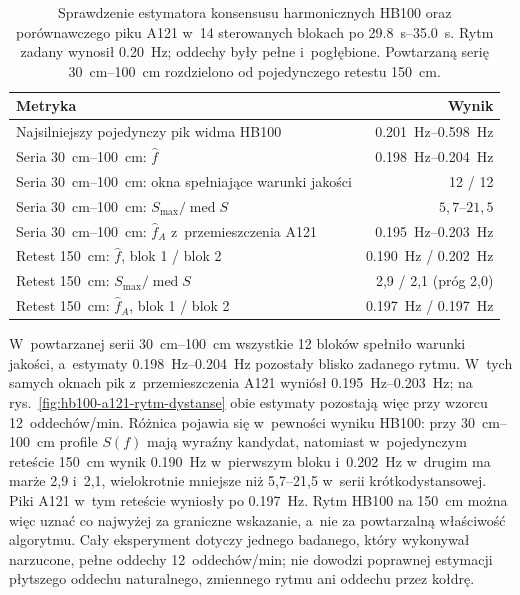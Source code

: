 \documentclass[12pt,a4paper,oneside]{report}
\begin{document}
\begin{table}[H]
\centering
\caption{Sprawdzenie estymatora konsensusu harmonicznych HB100 oraz
porównawczego piku A121 w~14 sterowanych blokach po
\SIrange{29.8}{35.0}{s}. Rytm zadany wynosił \SI{0.20}{Hz}; oddechy były
pełne i~pogłębione. Powtarzaną serię \SIrange{30}{100}{cm} rozdzielono od
pojedynczego retestu \SI{150}{cm}.}
\label{tab:hb100-harmonic-rhythm}
\small
\begin{tabular}{@{}p{8.3cm}r@{}}
\toprule
Metryka & Wynik \\
\midrule
Najsilniejszy pojedynczy pik widma HB100 & \SIrange{0.201}{0.598}{Hz} \\
Seria \SIrange{30}{100}{cm}: $\hat f$ & \SIrange{0.198}{0.204}{Hz} \\
Seria \SIrange{30}{100}{cm}: okna spełniające warunki jakości & 12 / 12 \\
Seria \SIrange{30}{100}{cm}: $S_{\max}/\operatorname{med}S$ & $5{,}7$--$21{,}5$ \\
Seria \SIrange{30}{100}{cm}: $\hat f_A$ z~przemieszczenia A121 & \SIrange{0.195}{0.203}{Hz} \\
Retest \SI{150}{cm}: $\hat f$, blok 1 / blok 2 & \SI{0.190}{Hz} / \SI{0.202}{Hz} \\
Retest \SI{150}{cm}: $S_{\max}/\operatorname{med}S$ & 2,9 / 2,1 (próg 2,0) \\
Retest \SI{150}{cm}: $\hat f_A$, blok 1 / blok 2 & \SI{0.197}{Hz} / \SI{0.197}{Hz} \\
\bottomrule
\end{tabular}
\end{table}

W~powtarzanej serii \SIrange{30}{100}{cm} wszystkie 12 bloków spełniło
warunki jakości, a~estymaty \SIrange{0.198}{0.204}{Hz} pozostały blisko
zadanego rytmu. W~tych samych oknach pik z~przemieszczenia A121 wyniósł
\SIrange{0.195}{0.203}{Hz}; na rys.~\ref{fig:hb100-a121-rytm-dystanse}
obie estymaty pozostają więc przy wzorcu 12~oddechów/min. Różnica pojawia się
w~pewności wyniku HB100: przy \SIrange{30}{100}{cm} profile $S(f)$ mają
wyraźny kandydat, natomiast w~pojedynczym reteście \SI{150}{cm} wynik
\SI{0.190}{Hz} w~pierwszym bloku i~\SI{0.202}{Hz} w~drugim ma marże 2,9
i~2,1, wielokrotnie mniejsze niż 5,7--21,5 w~serii krótkodystansowej. Piki
A121 w~tym reteście wyniosły po \SI{0.197}{Hz}. Rytm HB100 na
\SI{150}{cm} można więc uznać co najwyżej za graniczne wskazanie, a~nie za
powtarzalną właściwość algorytmu. Cały eksperyment dotyczy jednego badanego,
który wykonywał narzucone, pełne oddechy 12~oddechów/min; nie dowodzi
poprawnej estymacji płytszego oddechu naturalnego, zmiennego rytmu ani oddechu
przez kołdrę.
\end{document}
